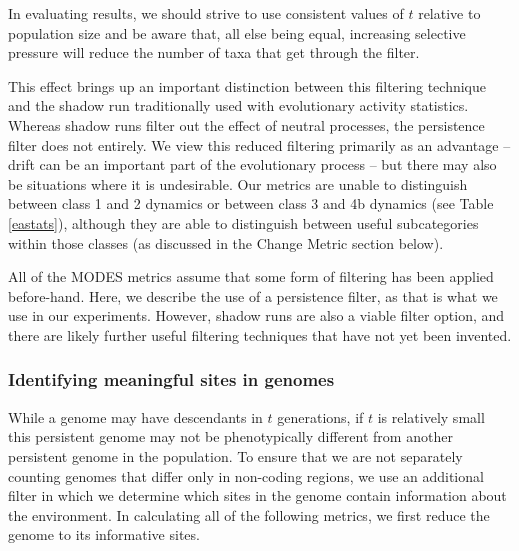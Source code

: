 \documentclass[letterpaper]{article}
\begin{document}
%
In evaluating results, we should strive to use consistent values of $t$ relative to population size and be aware that, all else being equal, increasing selective pressure will reduce the number of taxa that get through the filter.

This effect brings up an important distinction between this filtering technique and the shadow run traditionally used with evolutionary activity statistics. Whereas shadow runs filter out the effect of neutral processes, the persistence filter does not entirely. We view this reduced filtering primarily as an advantage -- drift can be an important part of the evolutionary process -- but there may also be situations where it is undesirable. Our metrics are unable to distinguish between class 1 and 2 dynamics or between class 3 and 4b dynamics (see Table \ref{eastats}), although they are able to distinguish between useful subcategories within those classes (as discussed in the Change Metric section below).

All of the MODES metrics assume that some form of filtering has been applied before-hand. Here, we describe the use of a persistence filter, as that is what we use in our experiments. However, shadow runs are also a viable filter option, and there are likely further useful filtering techniques that have not yet been invented.

\subsubsection{Identifying meaningful sites in genomes}
While a genome may have descendants in $t$ generations, if $t$ is relatively small this persistent genome may not be phenotypically different from another persistent genome in the population. To ensure that we are not separately counting genomes that differ only in non-coding regions, we use an additional filter in which we determine which sites in the genome contain information about the environment. In calculating all of the following metrics, we first reduce the genome to its informative sites.
    
\end{document}

